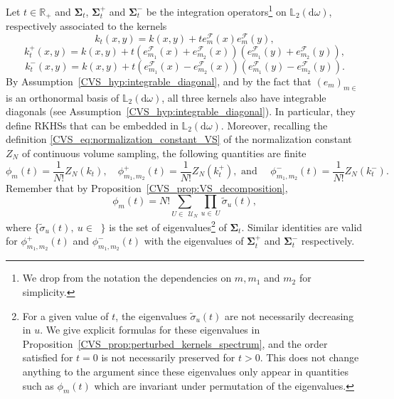 \documentclass[twoside,11pt]{book}
\numberwithin{theorem}{chapter}
\numberwithin{definition}{chapter}
\numberwithin{proposition}{chapter}
\numberwithin{corollary}{chapter}
\numberwithin{example}{chapter}
\numberwithin{lemma}{chapter}
\numberwithin{assumption}{chapter}
\numberwithin{equation}{chapter}
\numberwithin{figure}{chapter}
\DeclareMathOperator{\F}{\mathcal{F}}
\DeclareMathOperator{\X}{\mathcal{X}}
\def\Ltwo{\mathbb{L}_{2}(\mathrm{d} \omega)}
\DeclareMathOperator{\Ns}{\mathbb{N}^{*}}
\def\UN{\:\mathcal{U}_N}
\begin{document}
Let $t\in\mathbb{R}_{+}$ and $\bm{\Sigma}_{t}$, $\bm{\Sigma}_{t}^{+}$ and $\bm{\Sigma}_{t}^{-}$ be the integration operators\footnote{We drop from the notation the dependencies on $m,m_{1}$ and $m_{2}$ for simplicity.} on $\Ltwo$, respectively associated to the kernels
\begin{equation}\label{CVS_eq:k_t}
k_{t}(x,y) = k(x,y) + t e_{m}^{\F}(x) e_{m}^{\F}(y),
\end{equation}
\begin{equation}\label{CVS_eq:k_t_plus}
k_{t}^{+}(x,y) = k(x,y)  
 + t \left( e_{m_{1}}^{\F}(x) + e_{m_{2}}^{\F}(x) \right) \left( e_{m_{1}}^{\F}(y) + e_{m_{2}}^{\F}(y) \right),
\end{equation}
\begin{equation}\label{CVS_eq:k_t_minus}
k_{t}^{-}(x,y) = k(x,y)
 + t \left( e_{m_{1}}^{\F}(x) - e_{m_{2}}^{\F}(x) \right) \left( e_{m_{1}}^{\F}(y) - e_{m_{2}}^{\F}(y) \right).
\end{equation}
By Assumption~\ref{CVS_hyp:integrable_diagonal}, and by the fact that $(e_{m})_{m \in \Ns}$ is an orthonormal basis of $\Ltwo$, all three kernels also have integrable diagonals (see Assumption~\ref{CVS_hyp:integrable_diagonal}).
In particular, they define RKHSs that can be embedded in $\Ltwo$. Moreover, recalling the definition \eqref{CVS_eq:normalization_constant_VS} of the normalization constant $Z_{N}$ of continuous volume sampling, the following quantities are finite
\begin{equation}
\phi_{m}(t) = \frac{1}{N!} Z_{N}(k_{t}) , \quad\phi_{m_{1},m_{2}}^{+}(t) = \frac{1}{N!} Z_{N}(k_{t}^{+}),  \text{ and }\quad \phi_{m_{1},m_{2}}^{-}(t) = \frac{1}{N!} Z_{N}(k_{t}^{-}).
\end{equation}
Remember that by Proposition~\ref{CVS_prop:VS_decomposition},
\begin{equation}\label{CVS_eq:Z_kt}
\phi_{m}(t) = N! \sum\limits_{U \in \: \UN} \prod\limits_{u \in \: U} \tilde{\sigma}_{u}(t),
\end{equation}
where $\displaystyle \{\tilde{\sigma}_{u}(t), \: u \in \Ns\}$ is the set of eigenvalues\footnote{For a given value of $t$, the eigenvalues $\tilde{\sigma}_{u}(t)$ are not necessarily decreasing in $u$. We give explicit formulas for these eigenvalues in Proposition~\ref{CVS_prop:perturbed_kernels_spectrum}, and the order satisfied for $t=0$ is not necessarily preserved for $t>0$. This does not change anything to the argument since these eigenvalues only appear in quantities such as $\phi_{m}(t)$ which are invariant under permutation of the eigenvalues.} of $\bm{\Sigma}_{t}$. Similar identities are valid for $\phi_{m_{1},m_{2}}^{+}(t)$ and $\phi_{m_{1},m_{2}}^{-}(t)$ with the eigenvalues of $\bm{\Sigma}_{t}^{+}$ and $\bm{\Sigma}_{t}^{-}$ respectively.
\end{document}
